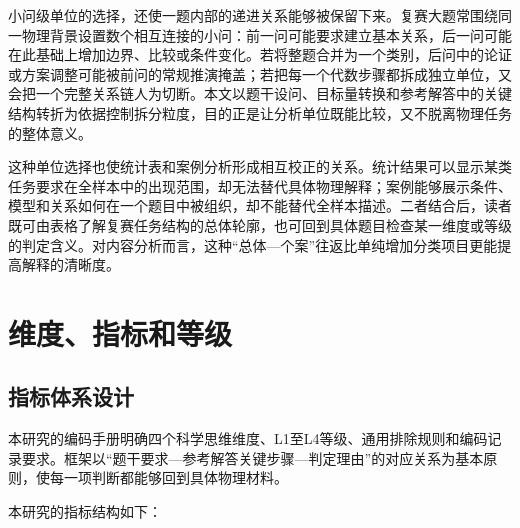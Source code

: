 \documentclass[
  12pt,
  a4paper]{ctexbook}
\begin{document}
小问级单位的选择，还使一题内部的递进关系能够被保留下来。复赛大题常围绕同一物理背景设置数个相互连接的小问：前一问可能要求建立基本关系，后一问可能在此基础上增加边界、比较或条件变化。若将整题合并为一个类别，后问中的论证或方案调整可能被前问的常规推演掩盖；若把每一个代数步骤都拆成独立单位，又会把一个完整关系链人为切断。本文以题干设问、目标量转换和参考解答中的关键结构转折为依据控制拆分粒度，目的正是让分析单位既能比较，又不脱离物理任务的整体意义。

这种单位选择也使统计表和案例分析形成相互校正的关系。统计结果可以显示某类任务要求在全样本中的出现范围，却无法替代具体物理解释；案例能够展示条件、模型和关系如何在一个题目中被组织，却不能替代全样本描述。二者结合后，读者既可由表格了解复赛任务结构的总体轮廓，也可回到具体题目检查某一维度或等级的判定含义。对内容分析而言，这种``总体---个案''往返比单纯增加分类项目更能提高解释的清晰度。

\section{维度、指标和等级}\label{ux7ef4ux5ea6ux6307ux6807ux548cux7b49ux7ea7}

\subsection{指标体系设计}\label{ux6307ux6807ux4f53ux7cfbux8bbeux8ba1}

本研究的编码手册明确四个科学思维维度、L1至L4等级、通用排除规则和编码记录要求。框架以``题干要求---参考解答关键步骤---判定理由''的对应关系为基本原则，使每一项判断都能够回到具体物理材料。

本研究的指标结构如下：
\end{document}

